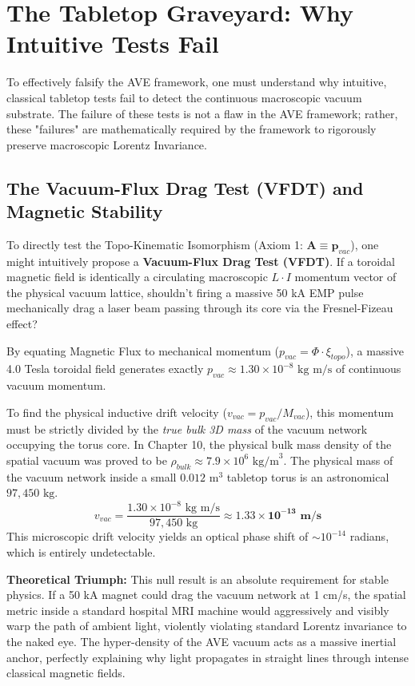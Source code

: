 \section{The Tabletop Graveyard: Why Intuitive Tests Fail}

To effectively falsify the AVE framework, one must understand why intuitive, classical tabletop tests fail to detect the continuous macroscopic vacuum substrate. The failure of these tests is not a flaw in the AVE framework; rather, these "failures" are mathematically required by the framework to rigorously preserve macroscopic Lorentz Invariance.

\subsection{The Vacuum-Flux Drag Test (VFDT) and Magnetic Stability}
To directly test the Topo-Kinematic Isomorphism (Axiom 1: $\mathbf{A} \equiv \mathbf{p}_{vac}$), one might intuitively propose a \textbf{Vacuum-Flux Drag Test (VFDT)}. If a toroidal magnetic field is identically a circulating macroscopic $L \cdot I$ momentum vector of the physical vacuum lattice, shouldn't firing a massive 50 kA EMP pulse mechanically drag a laser beam passing through its core via the Fresnel-Fizeau effect?

By equating Magnetic Flux to mechanical momentum ($p_{vac} = \Phi \cdot \xi_{topo}$), a massive 4.0 Tesla toroidal field generates exactly $p_{vac} \approx 1.30 \times 10^{-8} \text{ kg m/s}$ of continuous vacuum momentum.

To find the physical inductive drift velocity ($v_{vac} = p_{vac} / M_{vac}$), this momentum must be strictly divided by the \textit{true bulk 3D mass} of the vacuum network occupying the torus core. In Chapter 10, the physical bulk mass density of the spatial vacuum was proved to be $\rho_{bulk} \approx 7.9 \times 10^6 \text{ kg/m}^3$. The physical mass of the vacuum network inside a small $0.012$ m$^3$ tabletop torus is an astronomical \textbf{$97,450 \text{ kg}$}.
\begin{equation}
    v_{vac} = \frac{1.30 \times 10^{-8} \text{ kg m/s}}{97,450 \text{ kg}} \approx \mathbf{1.33 \times 10^{-13} \text{ m/s}}
\end{equation}
This microscopic drift velocity yields an optical phase shift of $\sim 10^{-14}$ radians, which is entirely undetectable. 

\textbf{Theoretical Triumph:} This null result is an absolute requirement for stable physics. If a 50 kA magnet could drag the vacuum network at 1 cm/s, the spatial metric inside a standard hospital MRI machine would aggressively and visibly warp the path of ambient light, violently violating standard Lorentz invariance to the naked eye. The hyper-density of the AVE vacuum acts as a massive inertial anchor, perfectly explaining why light propagates in straight lines through intense classical magnetic fields.

